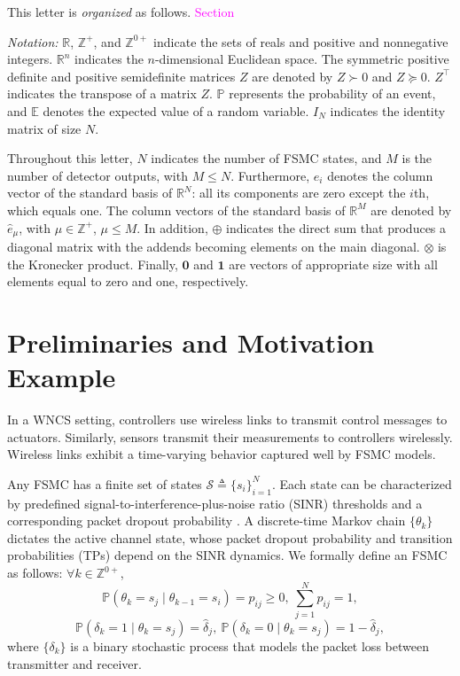 \documentclass[journal,twoside,web]{ieeecolor}
\begin{document}
This letter is \emph{organized} as follows. 
\textcolor{magenta}{Section}

\textit{Notation:} $\mathbb{R}$, $\mathbb{Z}^{+}$, and $\mathbb{Z}^{0+}$ indicate the sets of reals and positive and nonnegative integers. $\mathbb{R}^{n}$ indicates the $n$-dimensional Euclidean space. The symmetric positive definite and positive semidefinite matrices $Z$ are denoted by $Z\succ 0$ and $Z\succeq 0$. $Z^{\top}$ indicates the transpose of a matrix $Z$. $\mathbb{P}$ represents the probability of an event, and $\mathbb{E}$ denotes the expected value of a random variable. $I_N$ indicates the identity matrix of size $N$. 

Throughout this letter, $N$ indicates the number of FSMC states, and $M$ is the number of detector outputs, with $M\leq N$.
Furthermore, $e_i$ denotes the column vector of the standard basis of $\mathbb{R}^{N}$: all its components are zero except the $i$th, which equals one. The column vectors of the standard basis of $\mathbb{R}^{M}$ are denoted by $\hat{e}_{\mu}$, with $\mu\in\mathbb{Z}^{+}$, $\mu\leq M$. In addition, $\oplus$ indicates the direct sum that produces a diagonal matrix with the addends becoming elements on the main diagonal. $\otimes$ is the Kronecker product. Finally, $\mathbf{0}$ and $\mathbf{1}$ are vectors of appropriate size with all elements equal to zero and one, respectively.

\section{Preliminaries and Motivation Example}\label{sec:prelim}
In a WNCS setting, controllers use wireless links to transmit control messages to actuators. 
Similarly, sensors transmit their measurements to controllers wirelessly. Wireless links exhibit a time-varying behavior captured well by FSMC models. 

Any FSMC has a finite set of states $\mathcal{S}\triangleq\{s_i\}_{i=1}^{N}$. Each state can be characterized by predefined signal-to-interference-plus-noise ratio (SINR) thresholds and a corresponding packet dropout probability \cite{zacchialun2024access}. A discrete-time Markov chain $\{\theta_k\}$ dictates the active channel state, whose packet dropout probability and transition probabilities (TPs) depend on the SINR dynamics. We formally define an FSMC as follows: $\forall k\in \mathbb{Z}^{0+}$,
\begin{equation}\label{eq:p-ij}
    \mathbb{P}(\theta_{k} = s_j \mid \theta_{k-1} = s_i) = p_{ij} \geq 0,~ \sum_{j=1}^N p_{ij} = 1,
\end{equation}
\begin{equation}\label{eq:p-delta}
    \mathbb{P}(\delta_k = 1 \mid \theta_{k} = s_j) = \hat{\delta}_{j},~
    \mathbb{P}(\delta_k = 0 \mid \theta_{k} = s_j) = 1 - \hat{\delta}_{j},
\end{equation}
where $\{\delta_k\}$ is a binary stochastic process that models the packet loss between transmitter and receiver.
\end{document}
